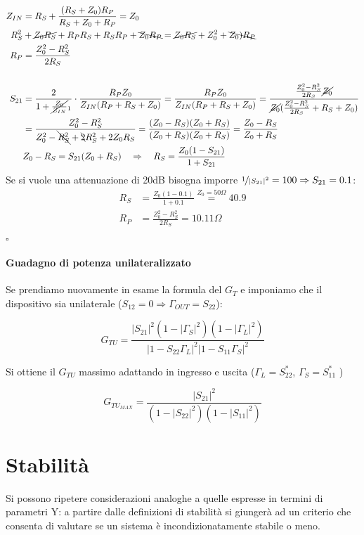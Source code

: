 \begin{align*}
Z_{IN} &=
R_S + \frac{(R_S + Z_0)R_P}{R_S+Z_0+R_P} = Z_0
\\
R_S^2 &+\cancel{Z_0R_S}+R_PR_S + R_SR_P+\bcancel{Z_0R_P} = \cancel{Z_0R_S} + Z_0^2 + \bcancel{Z_0)R_P}                                   	\\
R_P &= \frac{Z_0^2 - R_S^2}{2R_S}
\\
\\
S_{21} &= \frac{2}{1+\cancel{\frac{Z_0}{Z_{IN}}}_1} \cdot
\frac{R_P Z_0}{Z_{IN}(R_P+R_S+Z_0)}=
\frac{R_P Z_0}{Z_{IN}(R_P+R_S+Z_0)}=
\frac{\frac{Z_0^2 - R_S^2}{2R_S} \cancel{Z_0}}
{\cancel{Z_0}(\frac{Z_0^2-R_S^2}{2R_S}+R_S+Z_0)}
\\&=
\frac{Z_0^2 - R_S^2}
{Z_0^2-\bcancel{R_S^2}+\bcancel{2}R_S^2+2Z_0R_S} =
\frac{(Z_0 - R_S)(Z_0 + R_S)}
{(Z_0 + R_S)(Z_0 + R_S)} = \frac{Z_0-R_S}{Z_0+R_S}
\\
&Z_0-R_S = S_{21} (Z_0+R_S) \quad\Rightarrow\quad
R_S = \frac{Z_0(1-S_{21})}{1+S_{21}}
\end{align*}
Se si vuole una attenuazione di 20dB bisogna imporre $\nicefrac{1}{|S_{21}|^2}=100 \Rightarrow S_{21}=0.1$:
\begin{align*}
R_S &= \frac{Z_0(1-0.1)}{1+0.1}
\overset{Z_0 = 50\Omega}{=}
40.9\\
R_P &= \frac{Z_0^2 - R_S^2}{2R_S} = 10.11\Omega
\end{align*}

\hfill	$\square$

\paragraph{Guadagno di potenza unilateralizzato}
Se prendiamo nuovamente in esame la formula del $G_T$ e imponiamo che il dispositivo sia unilaterale ($S_{12}=0 \Rightarrow \Gamma_{OUT} = S_{22} $):

\[G_{TU} = \frac{|S_{21}|^2(1-|\Gamma_S|^2)(1-|\Gamma_L|^2)}
{|1- S_{22}\Gamma_L|^2|1-S_{11}\Gamma_S|^2}  \]

Si ottiene il $G_{TU}$ massimo adattando in ingresso e uscita ($\Gamma_L = S_{22}^*$, $\Gamma_S = S_{11}^*$ )

\[G_{TU_{MAX}} = \frac{|S_{21}|^2}{(1-|S_{22}|^2)(1-|S_{11}|^2)}\]

\section{Stabilità}
Si possono ripetere considerazioni analoghe a quelle espresse in termini di parametri Y: a partire dalle definizioni di stabilità si giungerà ad un criterio che consenta di valutare se un sistema è incondizionatamente stabile o meno.

